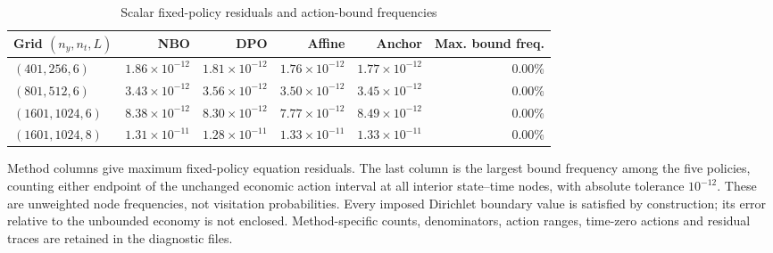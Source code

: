 \begin{table}[!htbp]
\centering\small\setlength{\tabcolsep}{3pt}
\caption{Scalar fixed-policy residuals and action-bound frequencies}
\label{tab:r14-reference-policies}
\begin{tabular}{lrrrrr}
\toprule
Grid $(n_y,n_t,L)$ & NBO & DPO & Affine & Anchor & Max. bound freq. \\
\midrule
$(401,256,6)$ & $1.86\times10^{-12}$ & $1.81\times10^{-12}$ & $1.76\times10^{-12}$ & $1.77\times10^{-12}$ & 0.00\% \\
$(801,512,6)$ & $3.43\times10^{-12}$ & $3.56\times10^{-12}$ & $3.50\times10^{-12}$ & $3.45\times10^{-12}$ & 0.00\% \\
$(1601,1024,6)$ & $8.38\times10^{-12}$ & $8.30\times10^{-12}$ & $7.77\times10^{-12}$ & $8.49\times10^{-12}$ & 0.00\% \\
$(1601,1024,8)$ & $1.31\times10^{-11}$ & $1.28\times10^{-11}$ & $1.33\times10^{-11}$ & $1.33\times10^{-11}$ & 0.00\% \\
\bottomrule
\end{tabular}
\par\medskip
\begin{minipage}{0.97\textwidth}\footnotesize
Method columns give maximum fixed-policy equation residuals. The last column is the largest bound frequency among the five policies, counting either endpoint of the unchanged economic action interval at all interior state--time nodes, with absolute tolerance $10^{-12}$. These are unweighted node frequencies, not visitation probabilities. Every imposed Dirichlet boundary value is satisfied by construction; its error relative to the unbounded economy is not enclosed. Method-specific counts, denominators, action ranges, time-zero actions and residual traces are retained in the diagnostic files.
\end{minipage}
\end{table}
